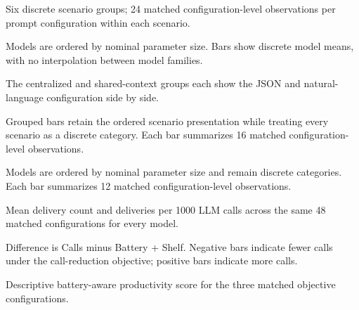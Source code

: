 \documentclass[11pt]{article}
\newcommand{\previewchart}[2]{%
    \begin{center}
        #1

        \vspace{2mm}
        \parbox{0.92\textwidth}{\centering\small #2}
    \end{center}
    \newpage
}
\begin{document}
\previewchart{\ChartPromptScenarios}
{Six discrete scenario groups; 24 matched configuration-level observations per prompt configuration within each scenario.}

\previewchart{\ChartPromptModels}
{Models are ordered by nominal parameter size. Bars show discrete model means, with no interpolation between model families.}

\previewchart{\ChartPromptArchitecture}
{The centralized and shared-context groups each show the JSON and natural-language configuration side by side.}

\previewchart{\ChartArchitectureScenarios}
{Grouped bars retain the ordered scenario presentation while treating every scenario as a discrete category. Each bar summarizes 16 matched configuration-level observations.}

\previewchart{\ChartArchitectureModels}
{Models are ordered by nominal parameter size and remain discrete categories. Each bar summarizes 12 matched configuration-level observations.}

\previewchart{\ChartMatchedModels}
{Mean delivery count and deliveries per 1000 LLM calls across the same 48 matched configurations for every model.}

\previewchart{\ChartCallAdaptability}
{Difference is Calls minus Battery + Shelf. Negative bars indicate fewer calls under the call-reduction objective; positive bars indicate more calls.}

\previewchart{\ChartBatteryProductivity}
{Descriptive battery-aware productivity score for the three matched objective configurations.}
\end{document}
